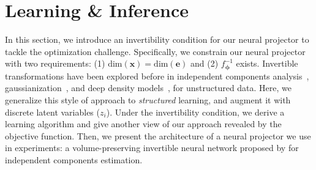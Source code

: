 \documentclass[11pt,a4paper]{article}
\begin{document}
\section{Learning \& Inference}

\label{sec:opt}



In this section, we introduce an invertibility condition for our neural projector to tackle the optimization challenge. Specifically, we constrain our neural projector with two requirements: (1) $\text{dim}(\bm{x}) = \text{dim}(\bm{e})$ and (2) $f_{\bm{\phi}}^{-1}$ exists. Invertible transformations have been explored before in independent components analysis~\citep{hyvarinen2004independent}, gaussianization~\citep{chen2001gaussianization}, and deep density models~\citep{dinh2014nice, dinh2016density, kingma2018glow}, for unstructured data. Here, we generalize this style of approach to \emph{structured} learning, and augment it with discrete latent variables ($z_i$). Under the invertibility condition, we derive a learning algorithm and give another view of our approach revealed by the objective function. Then, we present the architecture of a neural projector we use in experiments: a volume-preserving invertible neural network proposed by \citet{dinh2014nice} for independent components estimation.
\end{document}
